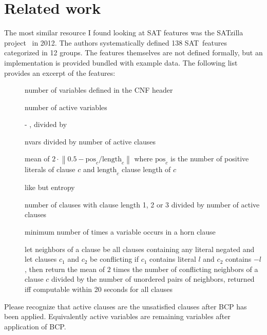 \section{Related work}
\label{sec:features-related}
%
The most similar resource I found looking at SAT features was the
SATzilla project~\cite{satzilla2004,satzilla2008} in 2012. The authors systematically defined
138 SAT~features categorized in 12 groups. The features themselves are not
defined formally, but an implementation is provided bundled with example data.
The following list provides an excerpt of the features:

\begin{description}
\item[] number of variables defined in the CNF header
\item[] number of active variables
\item[]  - , divided by 
\item[] nvars divided by number of active clauses
\item[] mean of $2 \cdot \left\| 0.5 - {\text{pos}_c}/{\text{length}_c}\right\|$ where $\text{pos}_c$ is the number of positive literals of clause $c$ and $\text{length}_c$ clause length of $c$
\item[] like  but entropy
\item[] number of clauses with clause length 1, 2 or 3 divided by number of active clauses
\item[] minimum number of times a variable occurs in a horn clause
\item[]
   let neighbors of a clause be all clauses containing any literal negated
   and let clauses $c_1$ and $c_2$ be conflicting if $c_1$ contains literal $l$ and $c_2$ contains $-l$,
   then return the mean of $2$ times the number of conflicting neighbors of a clause $c$
   divided by the number of unordered pairs of neighbors,
   returned iff computable within 20 seconds for all clauses
\end{description}

Please recognize that active clauses are the unsatisfied clauses after BCP has been applied.
Equivalently active variables are remaining variables after application of BCP.

